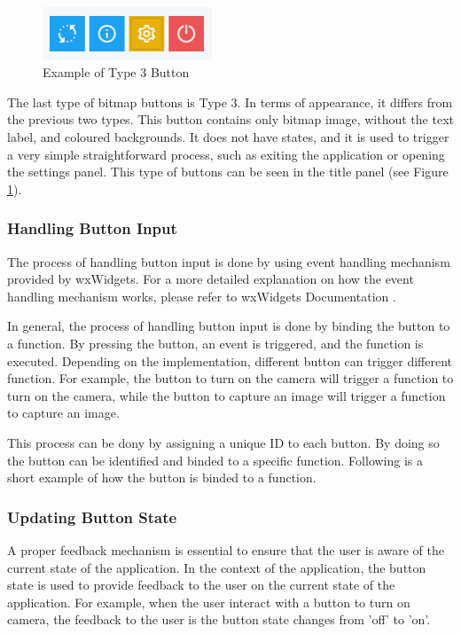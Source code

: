 \begin{figure}[!ht]
    \centering
    \includegraphics[width=0.45\textwidth]{texs/Part2/chapter4/image/type3state.png}
    \caption{Example of Type 3 Button}
    \label{fig:type3_state}
\end{figure}

The last type of bitmap buttons is Type 3. In terms of appearance, it differs from the previous two types. This button contains only bitmap image, without the text label, and coloured backgrounds. It does not have states, and it is used to trigger a  very simple straightforward process, such as exiting the application or opening the settings panel.
This type of buttons can be seen in the title panel (see Figure \ref{fig:type3_state}).

\subsubsection{Handling Button Input}
\label{subsubsec:handling_button_input}
The process of handling button input is done by using event handling mechanism provided by wxWidgets. For a more detailed explanation on how the event handling mechanism works, please refer to wxWidgets Documentation \cite{wxWidgetsEvent}.

In general, the process of handling button input is done by binding the button to a function. By pressing the button, an event is triggered, and the function is executed. Depending on the implementation, different button can trigger different function. For example, the button to turn on the camera will trigger a function to turn on the camera, while the button to capture an image will trigger a function to capture an image.

This process can be dony by assigning a unique ID to each button. By doing so the button can be identified and binded to a specific function. Following is a short example of how the button is binded to a function.

\subsubsection{Updating Button State}
A proper feedback mechanism is essential to ensure that the user is aware of the current state of the application. In the context of the application, the button state is used to provide feedback to the user on the current state of the application. For example, when the user interact with a button to turn on camera, the feedback to the user is the button state changes from 'off' to 'on'.

